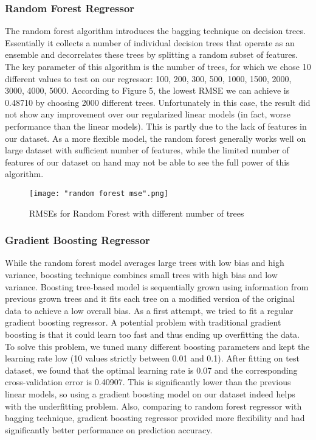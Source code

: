 \documentclass[twocolumn]{article}
\begin{document}
\subsubsection{Random Forest Regressor}
The random forest algorithm introduces the bagging technique on decision trees. Essentially it collects a number of individual decision trees that operate as an ensemble and  decorrelates these trees by splitting a random subset of features. The key parameter of this algorithm is the number of trees, for which we chose 10 different values to test on our regressor: 100, 200, 300, 500, 1000, 1500, 2000, 3000, 4000, 5000. According to Figure 5, the lowest RMSE we can achieve is 0.48710 by choosing 2000 different trees. Unfortunately in this case, the result did not show any improvement over our regularized linear models (in fact, worse performance than the linear models). This is partly due to the lack of features in our dataset. As a more flexible model, the random forest generally works well on large dataset with sufficient number of features, while the limited number of features of our dataset on hand may not be able to see the full power of this algorithm. 

\begin{figure}[h]
    \centering
    \texttt{[image: "random forest mse".png]}
    \caption{RMSEs for Random Forest with different number of trees}
\end{figure}

\subsubsection{Gradient Boosting Regressor}
While the random forest model averages large trees with low bias and high variance, boosting technique combines small trees with high bias and low variance. Boosting tree-based model is sequentially grown using information from previous grown trees and it fits each tree on a modified version of the original data to achieve a low overall bias. As a first attempt, we tried to fit a regular gradient boosting regressor. A potential problem with traditional gradient boosting is that it could learn too fast and thus ending up overfitting the data. To solve this problem, we tuned many different boosting parameters and kept the learning rate low (10 values strictly between 0.01 and 0.1). After fitting on test dataset, we found that the optimal learning rate is 0.07 and the corresponding cross-validation error is 0.40907. This is significantly lower than the previous linear models, so using a gradient boosting model on our dataset indeed helps with the underfitting problem. Also, comparing to random forest regressor with bagging technique, gradient boosting regressor provided more flexibility and had significantly better performance on prediction accuracy.
\end{document}
